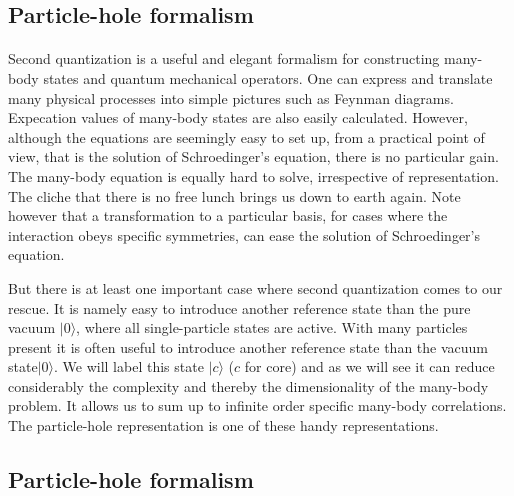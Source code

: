 \documentclass[%
twoside,                 %
final,                   %
10pt]{article}
\begin{document}
\subsection*{Particle-hole formalism}

\paragraph{}
Second quantization is a useful and elegant formalism  for constructing many-body  states and 
quantum mechanical operators. One can express and translate many physical processes
into simple pictures such as Feynman diagrams. Expecation values of many-body states are also easily calculated.
However, although the equations are seemingly easy to set up, from  a practical point of view, that is
the solution of Schroedinger's equation, there is no particular gain.
The many-body equation is equally hard to solve, irrespective of representation. 
The cliche that 
there is no free lunch brings us down to earth again.  
Note however that a transformation to a particular
basis, for cases where the interaction obeys specific symmetries, can ease the solution of Schroedinger's equation. 

But there is at least one important case where second quantization comes to our rescue.
It is namely easy to introduce another reference state than the pure vacuum $|0\rangle $, where all single-particle states are active.
With many particles present it is often useful to introduce another reference state  than the vacuum state$|0\rangle $. We will label this state $|c\rangle$ ($c$ for core) and as we will see it can reduce 
considerably the complexity and thereby the dimensionality of the many-body problem. It allows us to sum up to infinite order specific many-body correlations.  The particle-hole representation is one of these handy representations.



\subsection*{Particle-hole formalism}

\end{document}
